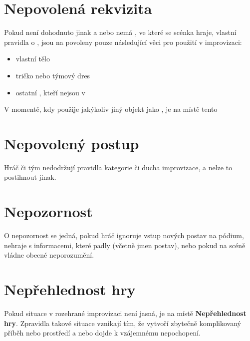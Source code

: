 \documentclass[main.tex]{subfiles}
\begin{document}
 
\needspace{5cm} \section{Nepovolená rekvizita} \label{nepovolená rekvizita}  
 
Pokud není dohodnuto jinak a nebo nemá , ve které se scénka hraje, vlastní pravidla o , jsou na  povoleny pouze následující věci pro použití v improvizaci: 
 
\begin{itemize}
\item  vlastní tělo
\item  tričko nebo týmový dres
\item  ostatní , kteří nejsou v 
\end{itemize}
 
V momentě, kdy  použije jakýkoliv jiný objekt jako , je na místě tento  
 
 
\needspace{5cm} \section{Nepovolený postup} \label{nepovolený postup}  
 
 
Hráč či tým nedodržují pravidla kategorie či ducha improvizace, a nelze to postihnout jinak. 
\needspace{5cm} \section{Nepozornost} \label{nepozornost}  
 
O nepozornost se jedná, pokud hráč ignoruje vstup nových postav na pódium, 
nehraje s informacemi, které padly (včetně jmen postav), nebo pokud na scéně  
vládne obecné neporozumění. 
 
 
\needspace{5cm} \section{Nepřehlednost hry} \label{nepřehlednost hry}  
 
Pokud situace v rozehrané improvizaci není jasná, je na místě  \textbf{Nepřehlednost hry}{}. Zpravidla takové situace vznikají tím, že  vytvoří zbytečně komplikovaný příběh nebo prostředí a nebo dojde k vzájemnému nepochopení. 
 
\end{document}
